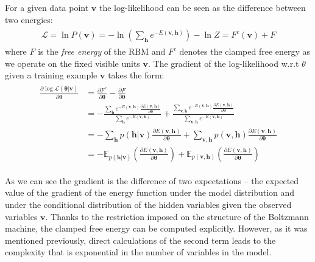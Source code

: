 \documentclass[../report/report.tex]{subfiles}
\begin{document}
For a given data point $\mathbf{v}$ the log-likelihood can be seen as the difference between two energies:
\begin{align}
\begin{split}
\mathcal{L} = \ln P(\mathbf{v}) = -\ln (\sum_{\mathbf{h}} e^{-E(\mathbf{v,h})} ) -\ln Z = F^c(\mathbf{v}) + F
\end{split}
\label{eq:loglikelihood}
\end{align}
where $F$ is the \emph{free energy} of the RBM and $F^c$ denotes the clamped free energy as we operate on the fixed visible units $\mathbf{v}$. The gradient of the log-likelihood w.r.t $\theta$ given a training example $\mathbf{v}$ takes the form:
\begin{align}
\begin{split}
\frac{\partial \log \mathcal{L}(\mathbf{\theta  | \mathbf{v}})}{\partial \mathbf{\theta}} & = \frac{\partial F^c }{\partial \mathbf{\theta}} - \frac{\partial F }{\partial \mathbf{\theta}} \\
& = - \frac{\sum_{\mathbf{h}} e^{-E(\mathbf{v,h})} \frac{\partial E(\mathbf{v,h})}{\partial \mathbf{\theta}}}{\sum_{\mathbf{h}} e^{-E(\mathbf{v,h})}} + \frac{\sum_{\mathbf{v, h}} e^{-E(\mathbf{v,h})} \frac{\partial E(\mathbf{v,h})}{\partial \mathbf{\theta}}}{\sum_{\mathbf{v, h}} e^{-E(\mathbf{v,h})}} \\
& = - \sum_\mathbf{h} p(\mathbf{h} | \mathbf{v}) \frac{\partial E(\mathbf{v,h})}{\partial \mathbf{\theta}} +  \sum_\mathbf{v, h} p(\mathbf{v}, \mathbf{h}) \frac{\partial E(\mathbf{v,h})}{\partial \mathbf{\theta}} \\
& =  - \mathbb{E}_{p(\mathbf{h} | \mathbf{v})} \left( \frac{\partial E(\mathbf{v,h})}{\partial \mathbf{\theta}} \right) + \mathbb{E}_{ p(\mathbf{v,h}) } \left( \frac{\partial E(\mathbf{v,h})}{\partial \mathbf{\theta}} \right)
\label{eq:gradient}
\end{split}
\end{align}

As we can see the gradient is the difference of two expectations -- the expected value of the gradient of the energy function under the model distribution and under the conditional distribution of the hidden variables given the observed variables $\mathbf{v}$. Thanks to the restriction imposed on the structure of the Boltzmann machine, the clamped free energy can be computed explicitly. However, as it was mentioned previously, direct calculations of the second term leads to the complexity that is exponential in the number of variables in the model.
\end{document}
